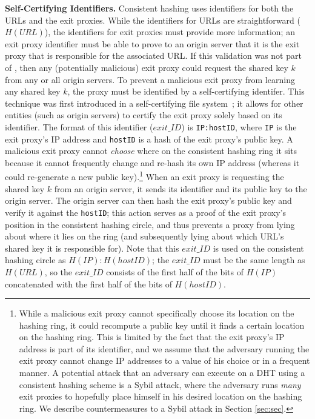 \textbf{Self-Certifying Identifiers.} Consistent hashing uses identifiers for both the URLs and 
the exit proxies.  While the identifiers for URLs are straightforward ($H(URL)$), the identifiers for exit 
proxies must provide more information; an exit proxy identifier must be able to prove to an origin server that 
it is the exit proxy that is responsible for the associated URL.  If this validation was not part of \system{}, 
then any (potentially malicious) exit proxy could request the shared key $k$ from any or all origin servers.  To 
prevent a malicious exit proxy from learning any shared key $k$, the proxy must be identified by a self-certifying 
identifer.  This technique was first introduced in a self-certifying file system~\cite{mazieres2000self}; it allows
for other entities (such as origin servers) to certify the exit proxy solely based on its identifier.  The format 
of this identifier ($exit\_ID$) is {\tt IP:hostID}, where {\tt IP} is the exit proxy's IP address and {\tt hostID} 
is a hash of the exit proxy's public key.  A malicious exit proxy cannot \textit{choose} where on the consistent 
hashing ring it sits because it cannot frequently change and re-hash its own IP address (whereas it could re-generate 
a new public key).\footnote{While a malicious exit proxy cannot specifically choose its location on the hashing ring, it 
could recompute a public key until it finds a certain location on the hashing ring.  This is limited by the fact that 
the exit proxy's IP address is part of its identifier, and we assume that the adversary running the exit proxy cannot 
change IP addresses to a value of his choice or in a frequent manner.  A potential attack that an adversary can execute 
on a DHT using a consistent hashing scheme is a Sybil attack, where the adversary runs {\it many} exit proxies to hopefully 
place himself in his desired location on the hashing ring.  We describe countermeasures to a Sybil attack in Section 
\ref{sec:sec}.} When an exit proxy is requesting the shared key $k$ from an origin server, 
it sends its identifier and its public key to the origin server.  The origin server
can then hash the exit proxy's 
public key and verify it against the {\tt hostID}; this action serves as a proof
of the exit proxy's position in the consistent hashing
circle, and thus prevents a proxy from lying about where it lies on the ring (and subsequently lying about which 
URL's shared key it is responsible for).  Note that this $exit\_ID$ is used on the consistent hashing circle as $H(IP):H(hostID)$; the 
$exit\_ID$ must be the same length as $H(URL)$, so the $exit\_ID$ consists of the first half of the bits of $H(IP)$ concatenated 
with the first half of the bits of $H(hostID)$.


